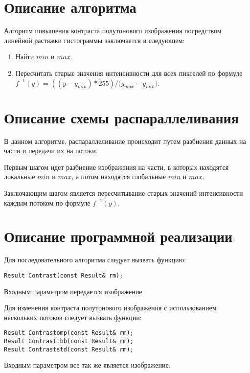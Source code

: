 \documentclass{report}
\begin{document}
\section*{Описание алгоритма}
Алгоритм повышения контраста полутонового изображения посредством линейной растяжки гистограммы заключается в следующем:
\begin{enumerate}
\item Найти $min$ и $max$.
\item Пересчитать старые значения интенсивности для всех пикселей по формуле $f^{-1}(y)$ = $((y - y_{min}) * 255) / ({{y_{max} - y_{min}})}$.
\end{enumerate}
\newpage

\section*{Описание схемы распараллеливания}
\par В данном алгоритме, распараллеливание происходит путем разбиения данных на части и передачи их на потоки.
\par Первым шагом идет разбиение изображения на части, в которых находятся локальные   $min$ и $max$, а потом находятся глобальные $min$ и $max$.
\par Заключающим шагом является пересчитывание старых значений интенсивности каждым потоком по формуле $f^{-1}(y)$.

\newpage

\section*{Описание программной реализации}
\par Для  последовательного алгоритма следует вызвать функцию:
\begin{lstlisting}
Result Contrast(const Result& rm);
\end{lstlisting}
\par Входным параметром передается изображение
\par Для изменения контраста полутонового изображения с использованием нескольких потоков следует вызвать функции:
\begin{lstlisting}
Result Contrastomp(const Result& rm);
Result Contrasttbb(const Result& rm);
Result Contraststd(const Result& rm);
\end{lstlisting}
\par Входным параметром все так же является изображение.
\newpage
\end{document}
